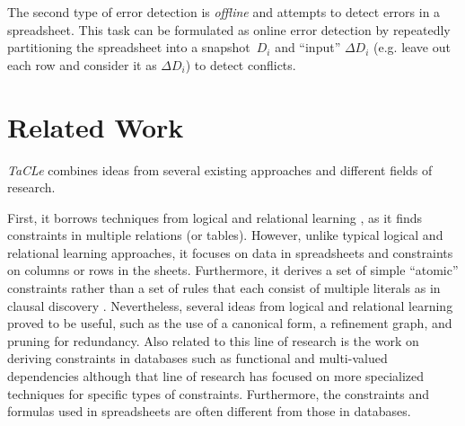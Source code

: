 \documentclass{IEEEtran}
\newcommand{\format}[1]{\textit{#1}\xspace}
\newcommand{\sname}{\format{TaCLe}}
\theoremstyle{definition}
\begin{document}
The second type of error detection is \textit{offline} and attempts to detect errors in a spreadsheet.
This task can be formulated as online error detection by repeatedly partitioning the spreadsheet into a snapshot~$D_i$ and ``input'' $\Delta D_i$ (e.g. leave out each row and consider it as $\Delta D_i$) to detect conflicts.


\section{Related Work}\label{sec:related_work}
\sname combines ideas from several existing
approaches and different fields of research.


First, it borrows techniques from logical and relational learning \cite{luc_book}, as it finds
constraints in multiple relations (or tables). However, unlike typical logical and relational learning
approaches, it focuses on data in spreadsheets and constraints on columns or rows in the sheets.
Furthermore, it derives a set of simple “atomic” constraints rather than a set of rules that each consist of multiple literals as in clausal discovery \cite{claudien,lallouet}. Nevertheless, several ideas from logical and relational learning
proved to be useful, such as the use of a canonical form, a refinement graph, and pruning for redundancy.
Also related to this line of research is the work on deriving constraints in databases such as functional and multi-valued dependencies \cite{savnik, Mannila-Raiha}
although that line of research has focused on more specialized techniques for specific types of constraints. Furthermore, the constraints and formulas used
in spreadsheets are often different from those in databases.
\end{document}
